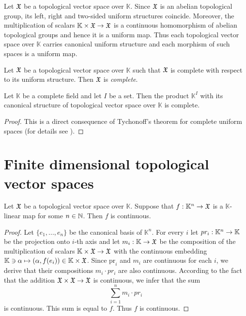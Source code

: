 \documentclass[10pt]{amsart}
\begin{document}
\begin{remark}\label{remark:uniform_structures_on_topological_vector_spaces}
	Let ${\mathfrak X}$ be a topological vector space over $\mathbb{K}$. Since ${\mathfrak X}$ is an abelian topological group, its left, right and two-sided uniform structures coincide. Moreover, the multiplication of scalars $\mathbb{K}\times {\mathfrak X}\rightarrow {\mathfrak X}$ is a continuous homomorphism of abelian topological groups and hence it is a uniform map. Thus each topological vector space over $\mathbb{K}$ carries canonical uniform structure and each morphism of such spaces is a uniform map.
\end{remark}

\begin{definition}
	Let ${\mathfrak X}$ be a topological vector space over $\mathbb{K}$ such that ${\mathfrak X}$ is complete with respect to its uniform structure. Then ${\mathfrak X}$ is \textit{complete}.
\end{definition}


\begin{corollary}\label{corollary:products_of_copies_of_field_are_complete}
	Let $\mathbb{K}$ be a complete field and let $I$ be a set. Then the product $\mathbb{K}^I$ with its canonical structure of topological vector space over $\mathbb{K}$ is complete.
\end{corollary}
\begin{proof}
	This is a direct consequence of Tychonoff's theorem for complete uniform spaces (for details see \cite{Uniform_Spaces}).
\end{proof}

\section{Finite dimensional topological vector spaces}

\begin{fact}\label{fact:linear_morphisms_from_standard_finite_spaces_are_always_continuous}
	Let ${\mathfrak X}$ be a topological vector space over $\mathbb{K}$. Suppose that $f:\mathbb{K}^n \rightarrow {\mathfrak X}$ is a $\mathbb{K}$-linear map for some $n\in {\mathbb N}$. Then $f$ is continuous.
\end{fact}
\begin{proof}
	Let $\{e_1,...,e_n\}$ be the canonical basis of $\mathbb{K}^n$. For every $i$ let $pr_i:\mathbb{K}^n\rightarrow \mathbb{K}$ be the projection onto $i$-th axis and let $m_{i}:\mathbb{K}\rightarrow {\mathfrak X}$ be the composition of the multiplication of scalars $\mathbb{K}\times {\mathfrak X}\rightarrow {\mathfrak X}$ with the continuous embedding $\mathbb{K} \ni \alpha \mapsto \left(\alpha, f(e_i)\right) \in \mathbb{K}\times {\mathfrak X}$. Since $\mathrm{pr}_i$ and $m_{i}$ are continuous for each $i$, we derive that their compositions $m_{i}\cdot pr_i$ are also continuous. According to the fact that the addition ${\mathfrak X}\times {\mathfrak X}\rightarrow {\mathfrak X}$ is continuous, we infer that the sum
	$$\sum_{i=1}^n m_{i}\cdot pr_{i}$$
	is continuous. This sum is equal to $f$. Thus $f$ is continuous.
\end{proof}
\end{document}
